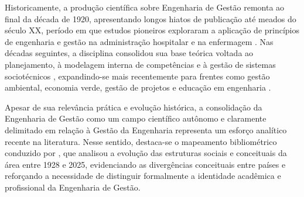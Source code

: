 Historicamente, a produção científica sobre Engenharia de Gestão remonta ao final da década de 1920, apresentando longos hiatos de publicação até meados do século XX, período em que estudos pioneiros exploraram a aplicação de princípios de engenharia e gestão na administração hospitalar e na enfermagem \cite{gilbreth1950, bartscht2010}. Nas décadas seguintes, a disciplina consolidou sua base teórica voltada ao planejamento, à modelagem interna de competências e à gestão de sistemas sociotécnicos \cite{bonjour2002, lal2013}, expandindo-se mais recentemente para frentes como gestão ambiental, economia verde, gestão de projetos e educação em engenharia \cite{liu2020, biancardi2023}.

Apesar de sua relevância prática e evolução histórica, a consolidação da Engenharia de Gestão como um campo científico autônomo e claramente delimitado em relação à Gestão da Engenharia representa um esforço analítico recente na literatura. Nesse sentido, destaca-se o mapeamento bibliométrico conduzido por , que analisou a evolução das estruturas sociais e conceituais da área entre 1928 e 2025, evidenciando as divergências conceituais entre países e reforçando a necessidade de distinguir formalmente a identidade acadêmica e profissional da Engenharia de Gestão.